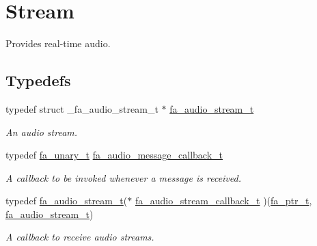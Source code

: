 \hypertarget{group___fa_audio_stream}{\section{Stream}
\label{group___fa_audio_stream}
}


Provides real-\/time audio.  


\subsection*{Typedefs}
\begin{DoxyCompactItemize}
\item 
typedef struct \-\_\-fa\-\_\-audio\-\_\-stream\-\_\-t $\ast$ \hyperlink{group___fa_audio_stream_ga78fbee3026130ce00d8e00a4e73a84c3}{fa\-\_\-audio\-\_\-stream\-\_\-t}
\begin{DoxyCompactList}\small\item\em An audio stream. \end{DoxyCompactList}\item 
typedef \hyperlink{group___fa_gaaafae8ab9ebae9019133108e56d2d4d1}{fa\-\_\-unary\-\_\-t} \hyperlink{group___fa_audio_stream_gaee8c48d438acabf22f2dfa3b85a4196c}{fa\-\_\-audio\-\_\-message\-\_\-callback\-\_\-t}
\begin{DoxyCompactList}\small\item\em A callback to be invoked whenever a message is received. \end{DoxyCompactList}\item 
typedef \hyperlink{group___fa_audio_stream_ga78fbee3026130ce00d8e00a4e73a84c3}{fa\-\_\-audio\-\_\-stream\-\_\-t}($\ast$ \hyperlink{group___fa_audio_stream_gab6aa7a7bed246893a5cb6d20d2e53199}{fa\-\_\-audio\-\_\-stream\-\_\-callback\-\_\-t} )(\hyperlink{group___fa_ga915ddeae99ad7568b273d2b876425197}{fa\-\_\-ptr\-\_\-t}, \hyperlink{group___fa_audio_stream_ga78fbee3026130ce00d8e00a4e73a84c3}{fa\-\_\-audio\-\_\-stream\-\_\-t})
\begin{DoxyCompactList}\small\item\em A callback to receive audio streams. \end{DoxyCompactList}\end{DoxyCompactItemize}
